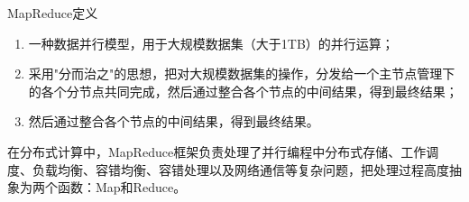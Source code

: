 \begin{frame}{\begin{CJK}{UTF8}{gkai}
			MapReduce定义
			\end{CJK}}
	\cite[pp.~74--75]{MapReduce}
	\begin{definition}
		\begin{enumerate}
			\item \begin{CJK}{UTF8}{gkai}
				一种数据并行模型，用于大规模数据集（大于1TB）的并行运算；\end{CJK}
			\item \begin{CJK}{UTF8}{gkai}采用\alert{"分而治之"}的思想，把对大规模数据集的操作，分发给一个主节点管理下的各个分节点共同完成，然后通过整合各个节点的中间结果，得到最终结果；\end{CJK}
			\item \begin{CJK}{UTF8}{gkai}然后通过整合各个节点的中间结果，得到最终结果。\end{CJK}
		\end{enumerate}
		
	\end{definition}
	\begin{CJK}{UTF8}{gkai}在分布式计算中，MapReduce框架负责处理了并行编程中分布式存储、工作调度、负载均衡、容错均衡、容错处理以及网络通信等复杂问题，把处理过程高度抽象为两个函数：Map和Reduce。\end{CJK}
	
\end{frame}

